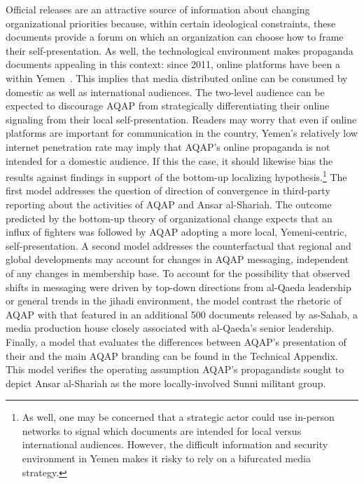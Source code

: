 Official releases are an attractive source of information about changing organizational priorities because, within certain ideological constraints, these documents
provide a forum on which an organization can choose how to
frame their self-presentation. As well, the technological environment makes propaganda documents appealing in this context: since 2011, online platforms have been a  within
Yemen~\autocite[33]{carapico2014yemen}. This implies that media distributed online can be consumed by domestic as well as international audiences. The two-level audience can be expected to discourage AQAP from strategically differentiating their online
signaling from their local self-presentation. Readers may worry that even if online platforms are important for communication in the country, Yemen's relatively low internet penetration rate may imply that AQAP's online propaganda is not intended for a domestic audience. If this the case, it should likewise bias the results against findings in support of the bottom-up localizing hypothesis.\footnote{As well, one may be concerned that a strategic actor could use in-person networks to signal which documents are intended for local versus international audiences. However, the difficult information and security environment in Yemen makes it risky to rely on a bifurcated media strategy.} 
The first model addresses the question of direction of convergence in third-party reporting about the activities
of AQAP and Ansar al-Shariah. The outcome predicted by the bottom-up theory of organizational change
expects that an influx of fighters was followed by AQAP adopting a
more local, Yemeni-centric, self-presentation. A second model addresses the counterfactual that regional  and global developments may account for changes in AQAP messaging, independent of any changes in membership base. To account for the possibility that observed shifts in messaging were driven by top-down directions from al-Qaeda leadership or general trends in the jihadi environment, the model contrast the rhetoric of AQAP with that
featured in an additional 500 documents released by as-Sahab, a media
production house closely associated with al-Qaeda's senior leadership.  Finally, a model that evaluates the differences between AQAP's presentation of their  and the main AQAP branding can be found in the Technical Appendix. This model verifies the operating assumption AQAP's propagandists sought to depict Ansar al-Shariah as the more locally-involved Sunni militant group.


